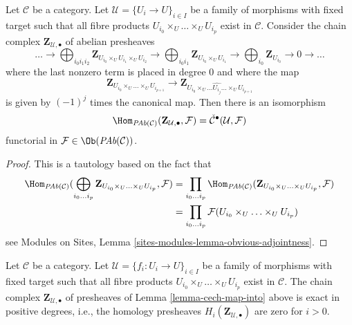\begin{lemma}
\label{lemma-cech-map-into}
Let $\mathcal{C}$ be a category. Let $\mathcal{U} = \{U_i \to U\}_{i \in I}$
be a family of morphisms with fixed target such that all fibre products
$U_{i_0} \times_U \ldots \times_U U_{i_p}$ exist in $\mathcal{C}$.
Consider the chain complex $\mathbf{Z}_{\mathcal{U}, \bullet}$
of abelian presheaves
$$
\ldots
\to
\bigoplus_{i_0i_1i_2} \mathbf{Z}_{U_{i_0} \times_U U_{i_1} \times_U U_{i_2}}
\to
\bigoplus_{i_0i_1} \mathbf{Z}_{U_{i_0} \times_U U_{i_1}}
\to
\bigoplus_{i_0} \mathbf{Z}_{U_{i_0}}
\to 0 \to \ldots
$$
where the last nonzero term is placed in degree $0$
and where the map
$$
\mathbf{Z}_{U_{i_0} \times_U \ldots \times_U U_{i_{p + 1}}}
\longrightarrow
\mathbf{Z}_{U_{i_0} \times_U
\ldots \widehat{U_{i_j}} \ldots \times_U U_{i_{p + 1}}}
$$
is given by $(-1)^j$ times the canonical map.
Then there is an isomorphism
$$
\Hom_{\textit{PAb}(\mathcal{C})}(\mathbf{Z}_{\mathcal{U}, \bullet}, \mathcal{F})
=
\check{\mathcal{C}}^\bullet(\mathcal{U}, \mathcal{F})
$$
functorial in $\mathcal{F} \in \Ob(\textit{PAb}(\mathcal{C}))$.
\end{lemma}

\begin{proof}
This is a tautology based on the fact that
\begin{align*}
\Hom_{\textit{PAb}(\mathcal{C})}(
\bigoplus_{i_0 \ldots i_p}
\mathbf{Z}_{U_{i_0} \times_U \ldots \times_U U_{i_p}},
\mathcal{F})
& =
\prod_{i_0 \ldots i_p}
\Hom_{\textit{PAb}(\mathcal{C})}(
\mathbf{Z}_{U_{i_0} \times_U \ldots \times_U U_{i_p}},
\mathcal{F}) \\
& =
\prod_{i_0 \ldots i_p}
\mathcal{F}(U_{i_0} \times_U \ldots \times_U U_{i_p})
\end{align*}
see Modules on Sites, Lemma \ref{sites-modules-lemma-obvious-adjointness}.
\end{proof}

\begin{lemma}
\label{lemma-homology-complex}
Let $\mathcal{C}$ be a category. Let
$\mathcal{U} = \{f_i : U_i \to U\}_{i \in I}$ be a family of morphisms
with fixed target such that all fibre products
$U_{i_0} \times_U \ldots \times_U U_{i_p}$ exist in $\mathcal{C}$.
The chain complex $\mathbf{Z}_{\mathcal{U}, \bullet}$ of presheaves
of Lemma \ref{lemma-cech-map-into} above is exact in positive
degrees, i.e., the homology presheaves
$H_i(\mathbf{Z}_{\mathcal{U}, \bullet})$ are zero for $i > 0$.
\end{lemma}


